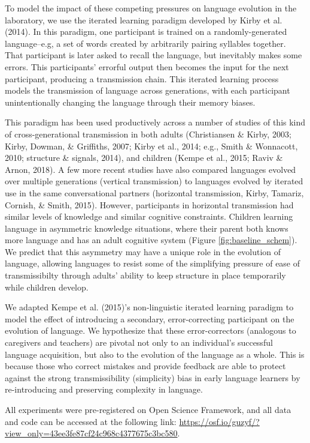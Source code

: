 \documentclass[10pt, letterpaper]{article}
\begin{document}
To model the impact of these competing pressures on language evolution
in the laboratory, we use the iterated learning paradigm developed by
Kirby et al. (2014). In this paradigm, one participant is trained on a
randomly-generated language--e.g, a set of words created by arbitrarily
pairing syllables together. That participant is later asked to recall
the language, but inevitably makes some errors. This participants'
errorful output then becomes the input for the next participant,
producing a transmission chain. This iterated learning process models
the transmission of language across generations, with each participant
unintentionally changing the language through their memory biases.

This paradigm has been used productively across a number of studies of
this kind of cross-generational transmission in both adults
(Christiansen \& Kirby, 2003; Kirby, Dowman, \& Griffiths, 2007; Kirby
et al., 2014; e.g., Smith \& Wonnacott, 2010; structure \& signals,
2014), and children (Kempe et al., 2015; Raviv \& Arnon, 2018). A few
more recent studies have also compared languages evolved over multiple
generations (vertical transmission) to languages evolved by iterated use
in the same conversational partners (horizontal transmission, Kirby,
Tamariz, Cornish, \& Smith, 2015). However, participants in horizontal
transmission had similar levels of knowledge and similar cognitive
constraints. Children learning language in asymmetric knowledge
situations, where their parent both knows more language and has an adult
cognitive system (Figure \ref{fig:baseline_schem}). We predict that this
asymmetry may have a unique role in the evolution of language, allowing
languages to resist some of the simplifying pressure of ease of
transmissibilty through adults' ability to keep structure in place
temporarily while children develop.

We adapted Kempe et al. (2015)'s non-linguistic iterated learning
paradigm to model the effect of introducing a secondary,
error-correcting participant on the evolution of language. We
hypothesize that these error-correctors (analogous to caregivers and
teachers) are pivotal not only to an individual's successful language
acquisition, but also to the evolution of the language as a whole. This
is because those who correct mistakes and provide feedback are able to
protect against the strong transmissibility (simplicity) bias in early
language learners by re-introducing and preserving complexity in
language.

All experiments were pre-registered on Open Science Framework, and all
data and code can be accessed at the following link:
\url{https://osf.io/guzyf/?view_only=43ee3fe87cf24c968c4377675c3bc580}.
\end{document}
